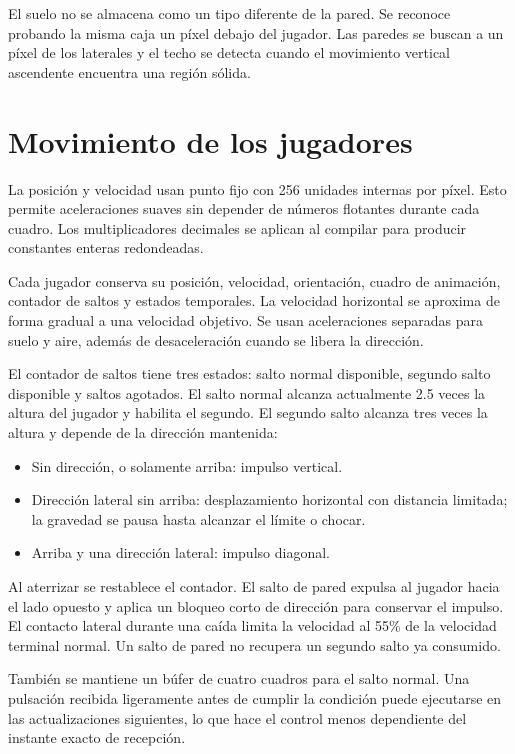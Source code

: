 \documentclass[11pt,letterpaper]{article}
\begin{document}
El suelo no se almacena como un tipo diferente de la pared. Se reconoce probando la
misma caja un píxel debajo del jugador. Las paredes se buscan a un píxel de los
laterales y el techo se detecta cuando el movimiento vertical ascendente encuentra
una región sólida.

\section{Movimiento de los jugadores}

La posición y velocidad usan punto fijo con 256 unidades internas por píxel. Esto
permite aceleraciones suaves sin depender de números flotantes durante cada cuadro.
Los multiplicadores decimales se aplican al compilar para producir constantes
enteras redondeadas.

Cada jugador conserva su posición, velocidad, orientación, cuadro de animación,
contador de saltos y estados temporales. La velocidad horizontal se aproxima de
forma gradual a una velocidad objetivo. Se usan aceleraciones separadas para suelo y
aire, además de desaceleración cuando se libera la dirección.

El contador de saltos tiene tres estados: salto normal disponible, segundo salto
disponible y saltos agotados. El salto normal alcanza actualmente 2.5 veces la altura
del jugador y habilita el segundo. El segundo salto alcanza tres veces la altura y
depende de la dirección mantenida:

\begin{itemize}
  \item Sin dirección, o solamente arriba: impulso vertical.
  \item Dirección lateral sin arriba: desplazamiento horizontal con distancia
  limitada; la gravedad se pausa hasta alcanzar el límite o chocar.
  \item Arriba y una dirección lateral: impulso diagonal.
\end{itemize}

Al aterrizar se restablece el contador. El salto de pared expulsa al jugador hacia el
lado opuesto y aplica un bloqueo corto de dirección para conservar el impulso. El
contacto lateral durante una caída limita la velocidad al 55\% de la velocidad
terminal normal. Un salto de pared no recupera un segundo salto ya consumido.

También se mantiene un búfer de cuatro cuadros para el salto normal. Una pulsación
recibida ligeramente antes de cumplir la condición puede ejecutarse en las
actualizaciones siguientes, lo que hace el control menos dependiente del instante
exacto de recepción.
\end{document}
